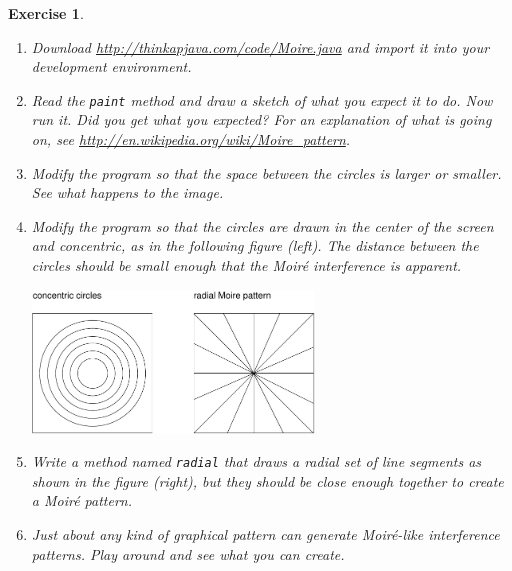 \documentclass[12pt]{book}
\theoremstyle{exercise}
\newtheorem{exercise}{Exercise}[chapter]
\begin{document}
\begin{exercise}
\begin{enumerate}

\item Download
\url{http://thinkapjava.com/code/Moire.java} and import it into
your development environment.

\item Read the {\tt paint} method and draw a sketch of
what you expect it to do.  Now run it.  Did you get what you
expected?  For an explanation of what is going on, see
\url{http://en.wikipedia.org/wiki/Moire_pattern}.

\item Modify the program so that the space between the circles is
larger or smaller.  See what happens to the image.

\item Modify the program so that the circles are drawn in the center
of the screen and concentric, as in the following figure (left).
The distance between the circles should be small enough
that the Moir\'{e} interference is apparent.

\includegraphics[height=1.5in]{figs/moire.pdf}

\item Write a method named {\tt radial} that draws a radial set
of line segments as shown in the figure (right), but they should be close
enough together to create a Moir\'{e} pattern.

\item Just about any kind of graphical pattern can generate
Moir\'{e}-like interference patterns.  Play around and see what you
can create.

\end{enumerate}
\end{exercise}


%
%
%
%

\printindex
\cleardoublepage
\end{document}
